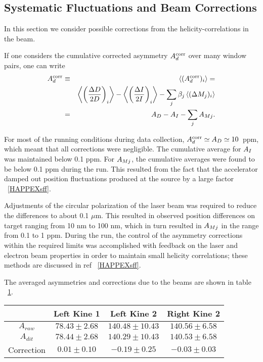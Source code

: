 \subsection{Systematic Fluctuations and Beam Corrections}
\label{sec:beamcorr}

In this section we consider possible corrections from
the helicity-correlations in the beam.

If one considers the cumulative corrected asymmetry
$A^{\rm corr}_d$ over many window pairs, one can write
\begin{eqnarray}
A^{\rm corr}_d & \equiv & \langle (A^{\rm corr}_d)_i\rangle = 
\nonumber \\
&  & 
\left\langle\left(\frac{\Delta D}{2D}\right)_i\right\rangle -
\left\langle\left(\frac{\Delta I}{2I}\right)_i\right\rangle
- \sum_j {\beta_j\left\langle{(\Delta M_j)_i}\right\rangle} 
\nonumber \\
&=& A_D -  A_I - \sum_j A_{Mj}.
\end{eqnarray}

For most of the running conditions during data collection,
$A^{\rm corr}_d\simeq A_D\simeq 10$~ppm, which meant that all
corrections were negligible. The cumulative average for $A_I$ was
maintained below 0.1 ppm. For $A_{Mj}$, the cumulative averages
were found to be below 0.1 ppm during the run.
This resulted from the fact that the accelerator
damped out position fluctuations produced at the source by a large
factor ~\ref{HAPPEXsff}.

Adjustments of the circular polarization of the
laser beam was required to reduce the differences to about 0.1 $\mu$m. 
This resulted in observed position differences on target
ranging from 10 nm to 100 nm, which in turn resulted in $A_{Mj}$
in the range from 0.1 to 1 ppm.
During the run, the control of the asymmetry corrections 
within the required limits was accomplished with feedback on 
the laser and electron beam properties in order to maintain 
small helicity correlations; these methods are 
discussed in ref ~\ref{HAPPEXsff}.

The averaged asymmetries and corrections due to the beams 
are shown in table ~\ref{tab:beamcorr}.

\begin{table}[!ht]
\begin{center}
\begin{tabular}{c|c|c|c}
\hline\hline
           &   Left Kine 1     &     Left Kine 2      &      Right Kine 2\\ \hline
$A_{raw}$    &  $78.43 \pm 2.68$ & $140.48 \pm 10.43$   &  $140.56 \pm 6.58$\\ \hline
$A_{dit}$    &  $78.44 \pm 2.68$ & $140.29 \pm 10.43$   &  $140.53 \pm 6.58$\\ \hline
Correction &  $0.01 \pm 0.10$      & $-0.19 \pm 0.25$         &  $-0.03 \pm 0.03$ \\ \hline
\hline
\end{tabular}
\end{center}
\label{tab:beamcorr}
\end{table}

